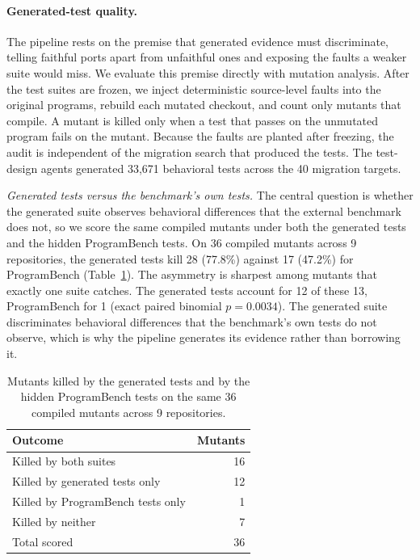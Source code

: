 \paragraph{Generated-test quality.}
The pipeline rests on the premise that generated evidence must discriminate, telling faithful ports apart from unfaithful ones and exposing the faults a weaker suite would miss.
We evaluate this premise directly with mutation analysis.
After the test suites are frozen, we inject deterministic source-level faults into the original programs, rebuild each mutated checkout, and count only mutants that compile.
A mutant is killed only when a test that passes on the unmutated program fails on the mutant.
Because the faults are planted after freezing, the audit is independent of the migration search that produced the tests.
The test-design agents generated 33,671 behavioral tests across the 40 migration targets.

\emph{Generated tests versus the benchmark's own tests.}
The central question is whether the generated suite observes behavioral differences that the external benchmark does not, so we score the same compiled mutants under both the generated tests and the hidden ProgramBench tests.
On 36 compiled mutants across 9 repositories, the generated tests kill 28 (77.8\%) against 17 (47.2\%) for ProgramBench (Table~\ref{tab:mutants}).
The asymmetry is sharpest among mutants that exactly one suite catches.
The generated tests account for 12 of these 13, ProgramBench for 1 (exact paired binomial $p = 0.0034$).
The generated suite discriminates behavioral differences that the benchmark's own tests do not observe, which is why the pipeline generates its evidence rather than borrowing it.

\begin{table}[h]
\centering
\caption{Mutants killed by the generated tests and by the hidden ProgramBench tests on the same 36 compiled mutants across 9 repositories.}
\label{tab:mutants}
\small
\begin{tabular}{lr}
\toprule
Outcome & Mutants \\
\midrule
Killed by both suites & 16 \\
Killed by generated tests only & 12 \\
Killed by ProgramBench tests only & 1 \\
Killed by neither & 7 \\
\midrule
Total scored & 36 \\
\bottomrule
\end{tabular}
\end{table}


